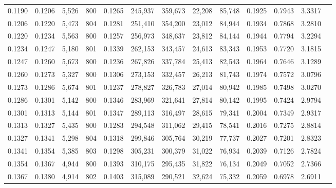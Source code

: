 \begin{tabular}{rrrrrrrrrrrrr}
0.1190 & 0.1206 &  5,526 & 800 &                                     0.1265 & 245,937 & 359,673 &  22,208 &  85,748 & 0.1925 & 0.7943 & 3.3317 \\
0.1206 & 0.1220 &  5,473 & 804 &                                     0.1281 & 251,410 & 354,200 &  23,012 &  84,944 & 0.1934 & 0.7868 & 3.2810 \\
0.1220 & 0.1234 &  5,563 & 800 &                                     0.1257 & 256,973 & 348,637 &  23,812 &  84,144 & 0.1944 & 0.7794 & 3.2294 \\
0.1234 & 0.1247 &  5,180 & 801 &                                     0.1339 & 262,153 & 343,457 &  24,613 &  83,343 & 0.1953 & 0.7720 & 3.1815 \\
0.1247 & 0.1260 &  5,673 & 800 &                                     0.1236 & 267,826 & 337,784 &  25,413 &  82,543 & 0.1964 & 0.7646 & 3.1289 \\
0.1260 & 0.1273 &  5,327 & 800 &                                     0.1306 & 273,153 & 332,457 &  26,213 &  81,743 & 0.1974 & 0.7572 & 3.0796 \\
0.1273 & 0.1286 &  5,674 & 801 &                                     0.1237 & 278,827 & 326,783 &  27,014 &  80,942 & 0.1985 & 0.7498 & 3.0270 \\
0.1286 & 0.1301 &  5,142 & 800 &                                     0.1346 & 283,969 & 321,641 &  27,814 &  80,142 & 0.1995 & 0.7424 & 2.9794 \\
0.1301 & 0.1313 &  5,144 & 801 &                                     0.1347 & 289,113 & 316,497 &  28,615 &  79,341 & 0.2004 & 0.7349 & 2.9317 \\
0.1313 & 0.1327 &  5,435 & 800 &                                     0.1283 & 294,548 & 311,062 &  29,415 &  78,541 & 0.2016 & 0.7275 & 2.8814 \\
0.1327 & 0.1341 &  5,298 & 804 &                                     0.1318 & 299,846 & 305,764 &  30,219 &  77,737 & 0.2027 & 0.7201 & 2.8323 \\
0.1341 & 0.1354 &  5,385 & 803 &                                     0.1298 & 305,231 & 300,379 &  31,022 &  76,934 & 0.2039 & 0.7126 & 2.7824 \\
0.1354 & 0.1367 &  4,944 & 800 &                                     0.1393 & 310,175 & 295,435 &  31,822 &  76,134 & 0.2049 & 0.7052 & 2.7366 \\
0.1367 & 0.1380 &  4,914 & 802 &                                     0.1403 & 315,089 & 290,521 &  32,624 &  75,332 & 0.2059 & 0.6978 & 2.6911 \\

\end{tabular}
